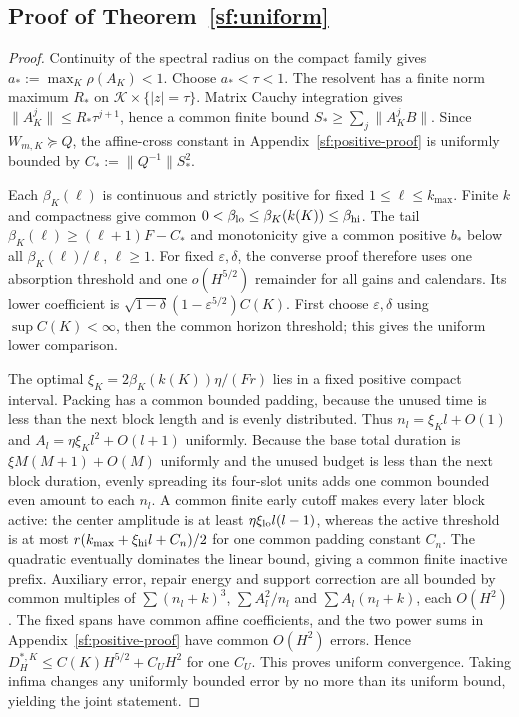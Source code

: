 \subsection{Proof of Theorem~\ref{sf:uniform}}
\begin{proof}
Continuity of the spectral radius on the compact family gives
$a_*:=\max_K\rho(A_K)<1$. Choose $a_*<\tau<1$.
The resolvent has a finite norm maximum $R_*$ on
$\mathcal K\times\{|z|=\tau\}$. Matrix Cauchy integration gives
$\|A_K^j\|\le R_*\tau^{j+1}$, hence a common finite bound
$S_*\ge\sum_j\|A_K^jB\|$.
Since $W_{m,K}\succeq Q$, the affine-cross constant in Appendix~\ref{sf:positive-proof} is
uniformly bounded by $C_*:=\|Q^{-1}\|S_*^2$.

Each $\beta_K(\ell)$ is continuous and strictly positive for fixed
$1\le\ell\le k_{\max}$. Finite $k$ and compactness give common
$0<\beta_{\rm lo}\le\beta_K(k(K))\le\beta_{\rm hi}$.
The tail $\beta_K(\ell)\ge(\ell+1)F-C_*$ and monotonicity give
a common positive $b_*$ below all $\beta_K(\ell)/\ell$, $\ell\ge1$.
For fixed $\varepsilon,\delta$, the converse proof therefore uses one
absorption threshold and one $o(H^{5/2})$ remainder for all gains and calendars.
Its lower coefficient is
$\sqrt{1-\delta}(1-\varepsilon^{5/2})C(K)$.
First choose $\varepsilon,\delta$ using $\sup C(K)<\infty$, then the common
horizon threshold; this gives the uniform lower comparison.

The optimal $\xi_K=2\beta_K(k(K))\eta/(Fr)$ lies in a fixed positive compact
interval. Packing has a common bounded padding, because the unused time is
less than the next block length and is evenly distributed.
Thus $n_l=\xi_Kl+O(1)$ and $A_l=\eta\xi_Kl^2+O(l+1)$ uniformly.
Because the base total duration is $\xi M(M+1)+O(M)$ uniformly and
the unused budget is less than the next block duration, evenly spreading
its four-slot units adds one common bounded even amount to each $n_l$.
A common finite early cutoff makes every later block active: the center amplitude is at least $\eta\xi_{\rm lo}l(l-1)$, whereas
the active threshold is at most $r(k_{\max}+\xi_{\rm hi}l+C_n)/2$
for one common padding constant $C_n$. The quadratic eventually dominates
the linear bound, giving a common finite inactive prefix. Auxiliary error, repair energy and support correction
are all bounded by common multiples of
$\sum(n_l+k)^3$, $\sum A_l^2/n_l$ and $\sum A_l(n_l+k)$, each $O(H^2)$.
The fixed spans have common affine coefficients, and the two power sums in
Appendix~\ref{sf:positive-proof} have common $O(H^2)$ errors. Hence
$D_H^{*,K}\le C(K)H^{5/2}+C_UH^2$ for one $C_U$.
This proves uniform convergence. Taking infima changes any uniformly bounded
error by no more than its uniform bound, yielding the joint statement.
\end{proof}
